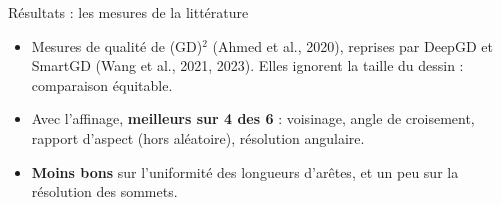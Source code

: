 \documentclass[aspectratio=169,11pt]{beamer}
\begin{document}
\begin{frame}{Résultats : les mesures de la littérature}
\centering
\footnotesize
\setlength{\tabcolsep}{4pt}

\vspace{0.3cm}
\begin{minipage}{0.94\textwidth}
\small
\begin{itemize}
\setlength{\itemsep}{2pt}
\item Mesures de qualité de (GD)$^2$ (Ahmed et al., 2020), reprises par DeepGD et SmartGD (Wang et al., 2021, 2023). Elles ignorent la taille du dessin : comparaison équitable.
\item Avec l'affinage, \textbf{meilleurs sur 4 des 6} : voisinage, angle de croisement, rapport d'aspect (hors aléatoire), résolution angulaire.
\item \textbf{Moins bons} sur l'uniformité des longueurs d'arêtes, et un peu sur la résolution des sommets.
\end{itemize}
\end{minipage}
\end{frame}
\end{document}
